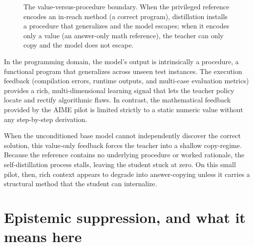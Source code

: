 \documentclass[12pt,a4paper]{report}
\begin{document}
\begin{figure}[htbp]
\centering
{}
\caption{The value-versus-procedure boundary. When the privileged reference encodes an in-reach method (a correct program), distillation installs a procedure that generalizes and the model escapes; when it encodes only a value (an answer-only math reference), the teacher can only copy and the model does not escape.}
\label{fig:bc-boundary}
\end{figure}

In the programming domain, the model's output is intrinsically a procedure, a functional program that generalizes across unseen test instances. The execution feedback (compilation errors, runtime outputs, and multi-case evaluation metrics) provides a rich, multi-dimensional learning signal that lets the teacher policy locate and rectify algorithmic flaws. In contrast, the mathematical feedback provided by the AIME pilot is limited strictly to a static numeric value without any step-by-step derivation.

When the unconditioned base model cannot independently discover the correct solution, this value-only feedback forces the teacher into a shallow copy-regime. Because the reference contains no underlying procedure or worked rationale, the self-distillation process stalls, leaving the student stuck at zero. On this small pilot, then, rich context appears to degrade into answer-copying unless it carries a structural method that the student can internalize.

\section{Epistemic suppression, and what it means here}\label{epistemic-suppression-and-what-it-means-here}
\end{document}
